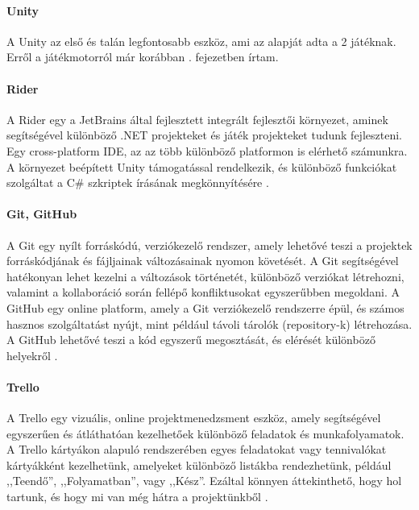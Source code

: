 \documentclass[]{thesis-ekf}
\theoremstyle{definition}
\theoremstyle{remark}
\begin{document}
\paragraph{Unity}

A Unity az első és talán legfontosabb eszköz, ami az alapját adta a 2 játéknak. Erről a játékmotorról már korábban . fejezetben írtam.

\paragraph{Rider}

A Rider egy a JetBrains által fejlesztett integrált fejlesztői környezet, aminek segítségével különböző .NET projekteket és játék projekteket tudunk fejleszteni. Egy cross-platform IDE, az az több különböző platformon is elérhető számunkra. A környezet beépített Unity támogatással rendelkezik, és különböző funkciókat szolgáltat a C\# szkriptek írásának megkönnyítésére \cite{Rider}.

\paragraph{Git, GitHub}

A Git egy nyílt forráskódú, verziókezelő rendszer, amely lehetővé teszi a projektek forráskódjának és fájljainak változásainak nyomon követését. A Git segítségével hatékonyan lehet kezelni a változások történetét, különböző verziókat létrehozni, valamint a kollaboráció során fellépő konfliktusokat egyszerűbben megoldani. A GitHub egy online platform, amely a Git verziókezelő rendszerre épül, és számos hasznos szolgáltatást nyújt, mint például távoli tárolók (repository-k) létrehozása. A GitHub lehetővé teszi a kód egyszerű megosztását, és elérését különböző helyekről \cite{Git} \cite{GitHub}.

\paragraph{Trello}

A Trello egy vizuális, online projektmenedzsment eszköz, amely segítségével egyszerűen és átláthatóan kezelhetőek különböző feladatok és munkafolyamatok. A Trello kártyákon alapuló rendszerében egyes feladatokat vagy tennivalókat kártyákként kezelhetünk, amelyeket különböző listákba rendezhetünk, például ,,Teendő'', ,,Folyamatban'', vagy ,,Kész''. Ezáltal könnyen áttekinthető, hogy hol tartunk, és hogy mi van még hátra a projektünkből \cite{Trello}.
\end{document}
